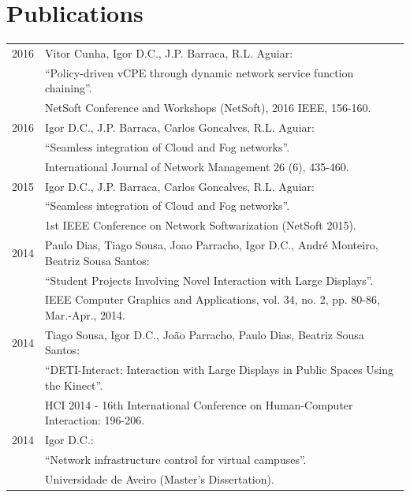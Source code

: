 \documentclass[letter,10pt]{article} %
\begin{document}
\section{Publications}
\label{section:publications}
\begin{tabular}{rl}
	\textsc{2016} & Vitor Cunha, Igor D.C., J.P. Barraca, R.L. Aguiar: \\
	& ``Policy-driven vCPE through dynamic network service function chaining''. \\
	& NetSoft Conference and Workshops (NetSoft), 2016 IEEE, 156-160. \normalsize\\
	
	\textsc{2016} & Igor D.C., J.P. Barraca, Carlos Goncalves, R.L. Aguiar: \\
	& ``Seamless integration of Cloud and Fog networks''. \\
	& International Journal of Network Management 26 (6), 435-460. \normalsize\\
	
	\textsc{2015} & Igor D.C., J.P. Barraca, Carlos Goncalves, R.L. Aguiar: \\
	& ``Seamless integration of Cloud and Fog networks''. \\
	& 1st IEEE Conference on Network Softwarization (NetSoft 2015). \normalsize\\
	
	\textsc{2014} & Paulo Dias, Tiago Sousa, Joao Parracho, Igor D.C., André Monteiro, Beatriz Sousa Santos: \\
	& ``Student Projects Involving Novel Interaction with Large Displays''. \\
	& IEEE Computer Graphics and Applications, vol. 34, no. 2, pp. 80-86, Mar.-Apr., 2014. \normalsize\\
	
	\textsc{2014} & Tiago Sousa, Igor D.C., João Parracho, Paulo Dias, Beatriz Sousa Santos: \\
	& ``DETI-Interact: Interaction with Large Displays in Public Spaces Using the Kinect''. \\
	& HCI 2014 - 16th International Conference on Human-Computer Interaction: 196-206. \normalsize\\
	
	\textsc{2014} & Igor D.C.: \\
	& ``Network infrastructure control for virtual campuses''. \\
	& Universidade de Aveiro (Master's Dissertation). \normalsize\\
	

\end{tabular}
\end{document}
